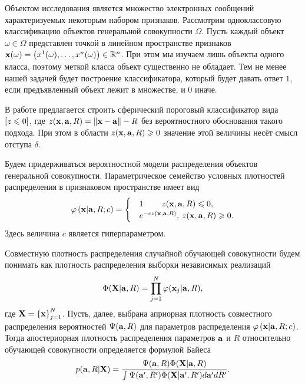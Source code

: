 Объектом исследования является множество электронных сообщений характеризуемых некоторым набором признаков.
Рассмотрим одноклассовую классификацию объектов генеральной совокупности $\Omega$.
Пусть каждый объект $\omega \in{\Omega}$  представлен точкой в линейном пространстве признаков
$\mathbf{x}(\omega)=\left(x^1(\omega),\ldots, x^n(\omega)\right) \in {\mathbb R^n}$. При этом мы изучаем лишь объекты одного класса, поэтому меткой класса объект существенно не обладает. 
Тем не менее нашей задачей будет построение классификатора, который будет давать ответ $1$, если предъявленный объект лежит в множестве, и $0$ иначе.

В работе \cite{} предлагается строить сферический пороговый классификатор вида 
$\left[z \leqslant 0\right] $, где $z(\mathbf{x},\mathbf{a},R)=\left\|{\mathbf{x}-\mathbf{a}}\right\|-R$ без вероятностного обоснования такого подхода. При этом в области $z(\mathbf{x}, \mathbf{a}, R) \geqslant 0$ значение этой величины несёт смысл отступа $\delta$.

\newcommand\cird[1]{\draw [fill = lightgray] (center) ++ (#1) circle (0.04);} %


Будем придерживаться вероятностной модели распределения объектов генеральной совокупности.
Параметрическое семейство условных плотностей распределения в признаковом пространстве имеет вид 
\begin{equation}
	\label{PhiXARC}
	\varphi \left( {\mathbf{x} | \mathbf{a},R;c} \right) =
		\begin{cases}
			&1 				\qquad  	\: 	z(\mathbf{x},\mathbf{a},R) \leqslant 0, \\
			&e^{-c z(\mathbf{x},\mathbf{a},R)}, 	\:	z(\mathbf{x},\mathbf{a},R) \geqslant 0.
		\end{cases} 
\end{equation}
Здесь величина $c$ является гиперпараметром.


Совместную плотность распределения случайной обучающей совокупности будем понимать как плотность распределения выборки независимых реализаций
$$\Phi(\mathbf{X}|\mathbf{a},R)=\prod_{j=1}^N \varphi(\mathbf{x}_j|\mathbf{a},R),$$ 
где $\mathbf{X}=\left\{\mathbf{x}\right\}_{j=1}^N$.
Пусть, далее, выбрана априорная плотность совместного распределения вероятностей $\Psi(\mathbf{a},R)$ для параметров распределения $\varphi \left(\mathbf{x} | \mathbf{a},R;c\right)$. 
Тогда апостериорная плотность распределения параметров $\mathbf{a}$ и $R$ относительно обучающей совокупности определяется формулой Байеса
\begin{equation}
	\label{Prob:aRX}
	p(\mathbf{a},R|\mathbf{X})
	= \frac {\Psi(\mathbf{a},R) \Phi(\mathbf{X}|\mathbf{a},R)}
			{\int {\Psi(\ensuremath{\mathbf{a}}',R') \Phi(\ensuremath{\mathbf{X}}|\ensuremath{\mathbf{a}}',R')d\ensuremath{\mathbf{a}}'dR'}}.
\end{equation}

